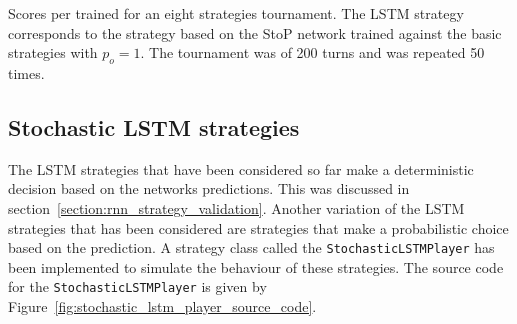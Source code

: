 \begin{table}[!htbp]
    \begin{center}
    \resizebox{\textwidth}{!}{
        
    }
\end{center}
\caption{Scores per trained for an eight strategies tournament. The LSTM strategy
corresponds to the strategy based on the StoP network trained
against the basic strategies with $p_o=1$. The tournament was of 200 turns and was
repeated 50 times.}\label{table:scores_s_to_p_basic_against_seven}
\end{table}


\subsection{Stochastic LSTM strategies}\label{sec:stochastic-lstm-strategies}

The LSTM strategies that have been considered so far make a deterministic
decision based on the networks predictions. This was discussed in
section~\ref{section:rnn_strategy_validation}. Another variation of the LSTM
strategies that has been considered are strategies that make a probabilistic
choice based on the prediction. A strategy class called the
\texttt{StochasticLSTMPlayer} has been implemented to simulate the
behaviour of these strategies. The source code for the
\texttt{StochasticLSTMPlayer} is given by
Figure~\ref{fig:stochastic_lstm_player_source_code}.

